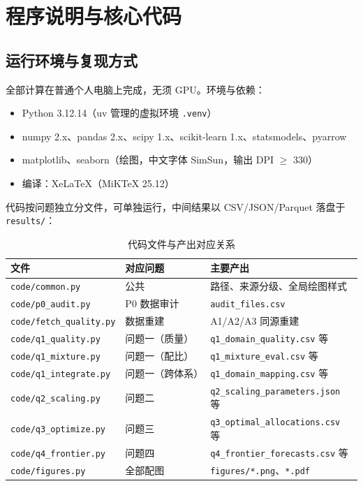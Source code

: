 \section{程序说明与核心代码}

\subsection{运行环境与复现方式}

全部计算在普通个人电脑上完成，无须 GPU。环境与依赖：

\begin{itemize}[leftmargin=2em,itemsep=2pt]
\item Python 3.12.14（uv 管理的虚拟环境 \texttt{.venv}）
\item numpy 2.x、pandas 2.x、scipy 1.x、scikit-learn 1.x、statsmodels、pyarrow
\item matplotlib、seaborn（绘图，中文字体 SimSun，输出 DPI $\ge$ 330）
\item 编译：XeLaTeX（MiKTeX 25.12）
\end{itemize}

代码按问题独立分文件，可单独运行，中间结果以 CSV/JSON/Parquet 落盘于 \texttt{results/}：

\begin{table}[htbp]
\centering
\caption{代码文件与产出对应关系}
\label{tab:code}
\small
\begin{tabular}{l|l|l}
\toprule
\textbf{文件} & \textbf{对应问题} & \textbf{主要产出} \\
\midrule
\texttt{code/common.py} & 公共 & 路径、来源分级、全局绘图样式 \\
\texttt{code/p0\_audit.py} & P0 数据审计 & \texttt{audit\_files.csv} \\
\texttt{code/fetch\_quality.py} & 数据重建 & A1/A2/A3 同源重建 \\
\texttt{code/q1\_quality.py} & 问题一（质量） & \texttt{q1\_domain\_quality.csv} 等 \\
\texttt{code/q1\_mixture.py} & 问题一（配比） & \texttt{q1\_mixture\_eval.csv} 等 \\
\texttt{code/q1\_integrate.py} & 问题一（跨体系） & \texttt{q1\_domain\_mapping.csv} 等 \\
\texttt{code/q2\_scaling.py} & 问题二 & \texttt{q2\_scaling\_parameters.json} 等 \\
\texttt{code/q3\_optimize.py} & 问题三 & \texttt{q3\_optimal\_allocations.csv} 等 \\
\texttt{code/q4\_frontier.py} & 问题四 & \texttt{q4\_frontier\_forecasts.csv} 等 \\
\texttt{code/figures.py} & 全部配图 & \texttt{figures/*.png}、\texttt{*.pdf} \\
\bottomrule
\end{tabular}
\end{table}

